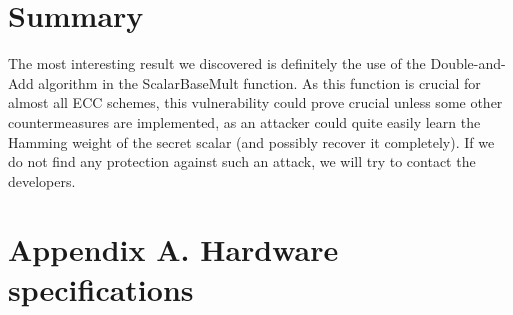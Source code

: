 \documentclass[a4paper]{scrartcl}
\begin{document}

\section{Summary}
The most interesting result we discovered is definitely the use of the Double-and-Add algorithm in the ScalarBaseMult function. As this function is crucial for almost all ECC schemes, this vulnerability could prove crucial unless some other countermeasures are implemented, as an attacker could quite easily learn the Hamming weight of the secret scalar (and possibly recover it completely). If we do not find any protection against such an attack, we will try to contact the developers.



\section{Appendix A. Hardware specifications}
\end{document}
